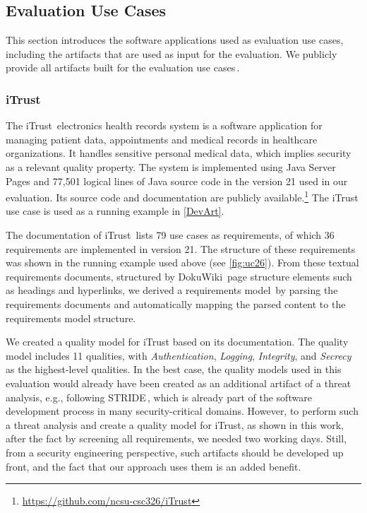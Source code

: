 
\subsection{Evaluation Use Cases}
This section introduces the software applications used as evaluation use cases, including the artifacts that are used as input for the evaluation. We publicly provide all artifacts built for the evaluation use cases\,\cite{replication}.

\subsubsection{iTrust}

The iTrust\,\cite{heckman2018} electronics health records system is a software application for managing patient data, appointments and medical records in healthcare organizations. It handles sensitive personal medical data, which implies security as a relevant quality property.
The system is implemented using Java Server Pages and 77,501 logical lines of Java source code in the version 21 used in our evaluation.
Its source code and documentation are publicly available.\footnote{\url{https://github.com/ncsu-csc326/iTrust}}
The iTrust use case is used as a running example in \autoref{DevArt}.

The documentation of iTrust\,\cite{iTrustWiki} lists 79 use cases as requirements, of which 36 requirements are implemented in version 21.
The structure of these requirements was shown in the running example used above (see \autoref{fig:uc26}).
From these textual requirements documents, structured by DokuWiki\,\cite{dokuwiki} page structure elements such as headings and hyperlinks, we derived a requirements model\,\cite{Grosser2022RDR} by parsing the requirements documents and automatically mapping the parsed content to the requirements model structure.

We created a quality model for iTrust based on its documentation. The quality model includes 11 qualities, with \emph{Authentication}, \emph{Logging}, \emph{Integrity}, and \emph{Secrecy} as the highest-level qualities. In the best case, the quality models used in this evaluation would already have been created as an additional artifact of a threat analysis, e.g., following STRIDE\,\cite{STRIDE}, which is already part of the software development process in many security-critical domains.
However, to perform such a threat analysis and create a quality model for iTrust, as shown in this work, after the fact by screening all requirements, we needed two working days. Still, from a security engineering perspective, such artifacts should be developed up front, and the fact that our approach uses them is an added benefit.


